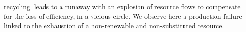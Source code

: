 \documentclass[12pt,a4paper]{article}%
\begin{document}
\begin{appendix}
recycling, leads to a runaway with an explosion of resource flows to compensate for the loss of efficiency, in a vicious circle. We observe here a production failure linked to the exhaustion of a non-renewable and non-substituted resource.  
\end{appendix}
\end{document}
